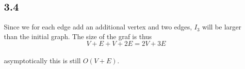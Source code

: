 \subsection*{3.4}
Since we for each edge add an additional vertex and two edges, $I_3$
will be larger than the initial graph. The size of the graf is thus
\begin{equation*}
    V + E + V + 2E = 2V + 3E
\end{equation*}\\
asymptotically this is still $O(V + E)$.

